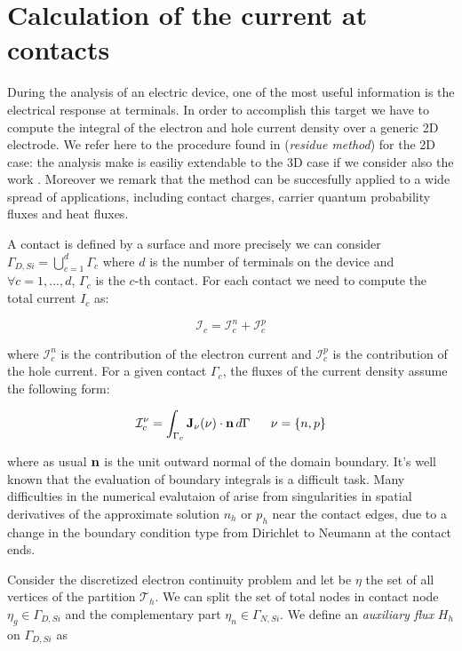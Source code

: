 \clearpage

\section{Calculation of the current at contacts}

During the analysis of an electric device, one of the most useful information is the electrical response at terminals. In order to accomplish this target we have to compute the integral of the electron and hole current density over a generic 2D electrode. We refer here to the procedure found in \cite{ContactCurrentRM} (\textit{residue method}) for the 2D case: the analysis make is easiliy extendable to the 3D case if we consider also the work \cite{GalerkMethConsHughes}. Moreover we remark that the method can be succesfully applied to a wide spread of applications, including contact charges, carrier quantum probability fluxes and heat fluxes.

A contact is defined by a surface and more precisely we can consider $\Gamma_{D,Si} = \bigcup_{c=1}^d \Gamma_c$ where $d$ is the number of terminals on the device and $\forall c=1,...,d$, $\Gamma_c$ is the $c$-th contact. For each contact we need to compute the total current $I_c$ as:

\begin{equation}
\mathcal{I}_c = \mathcal{I}_c^n + \mathcal{I}_c^p
\end{equation}

where $\mathcal{I}_c^n$ is the contribution of the electron current and $\mathcal{I}_c^p$ is the contribution of the hole current.
For a given contact $\Gamma_c$, the fluxes of the current density assume the following form:

\begin{equation}
\label{eq: current flux}
\mathcal{I}_c^\nu = \int_{\Gamma_c}\vect{J}_\nu(\nu) \cdot \vect{n} \, d{\Gamma} \psp{10} \nu = \{n,p\}
\end{equation}

where as usual $\mathbf{n}$ is the unit outward normal of the domain boundary. It's well known that the evaluation of boundary integrals is a difficult task. Many difficulties in the numerical evalutaion of  arise from singularities in spatial derivatives of the approximate solution $n_h$ or $p_h$ near the contact edges, due to a change in the boundary condition type from Dirichlet to Neumann at the contact ends.



Consider the discretized electron continuity problem  and let be $\eta$  the set of all vertices of the partition $\mathcal{T}_h$.  We can split the set of total nodes in contact node $\eta_g \in \Gamma_{D,Si}$ and the complementary part $\eta_n \in \Gamma_{N,Si}$. We define an \textit{auxiliary flux} $H_h$ on $\Gamma_{D,Si}$ as

